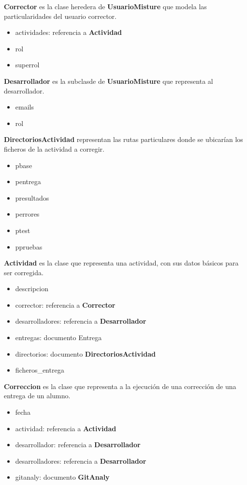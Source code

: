 \textbf{Corrector} es la clase heredera de \textbf{UsuarioMisture} que modela las particularidades del usuario corrector.
\begin{itemize}
\item actividades: referencia a \textbf{Actividad}
\item rol
\item superrol
\end{itemize}


\textbf{Desarrollador} es la subclasde de \textbf{UsuarioMisture} que representa al desarrollador.
\begin{itemize}
\item emails
\item rol
\end{itemize}


\textbf{DirectoriosActividad} representan las rutas particulares donde se ubicarían los ficheros de la actividad a corregir.
\begin{itemize}
\item pbase
\item pentrega
\item presultados
\item perrores
\item ptest
\item ppruebas
\end{itemize}


\textbf{Actividad} es la clase que representa una actividad, con sus datos básicos para ser corregida.
\begin{itemize}
\item descripcion
\item corrector: referencia a \textbf{Corrector}
\item desarrolladores: referencia a \textbf{Desarrollador}
\item entregas: documento Entrega
\item directorios: documento \textbf{DirectoriosActividad}
\item ficheros\_entrega
\end{itemize}


\textbf{Correccion} es la clase que representa a la ejecución de una corrección de una entrega de un alumno.
\begin{itemize}
\item fecha
\item actividad: referencia a \textbf{Actividad}
\item desarrollador: referencia a \textbf{Desarrollador}
\item desarrolladores: referencia a \textbf{Desarrollador}
\item gitanaly: documento \textbf{GitAnaly}
\end{itemize}


